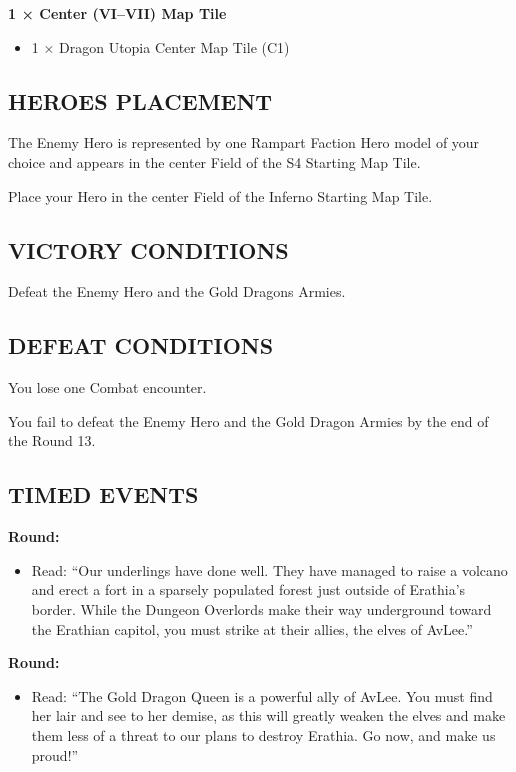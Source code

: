\begin{multicols*}{2}
\textbf{1 × Center (VI--VII) Map Tile}
\begin{itemize}
  \item 1 × Dragon Utopia Center Map Tile (C1)
\end{itemize}

\subsection*{\MakeUppercase{Heroes Placement}}

The Enemy Hero is represented by one Rampart Faction Hero model of your choice
and appears in the center Field of the S4 Starting Map Tile.

Place your Hero in the center Field of the Inferno Starting Map Tile.

\subsection*{\MakeUppercase{Victory Conditions}}

Defeat the Enemy Hero and the Gold Dragons Armies.

\subsection*{\MakeUppercase{Defeat Conditions}}

You lose one Combat encounter.

You fail to defeat the Enemy Hero and the Gold Dragon Armies by the end of the Round 13.

\subsection*{\MakeUppercase{Timed Events}}

\textbf{ Round:}
\begin{itemize}
  \item Read: ``Our underlings have done well. They have managed to raise a volcano
    and erect a fort in a sparsely populated forest just outside of Erathia's border.
    While the Dungeon Overlords make their way underground toward the Erathian capitol,
    you must strike at their allies, the elves of AvLee.''
\end{itemize}

\textbf{ Round:}
\begin{itemize}
  \item Read: ``The Gold Dragon Queen is a powerful ally of AvLee.
    You must find her lair and see to her demise, as this will greatly weaken
    the elves and make them less of a threat to our plans to destroy Erathia.
    Go now, and make us proud!''
\end{itemize}


\end{multicols*}

